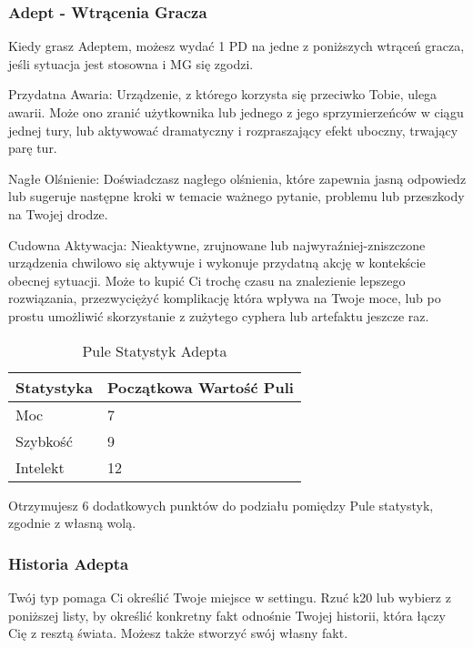 \subsubsection{Adept - Wtrącenia Gracza}

Kiedy grasz Adeptem, możesz wydać 1 PD na jedne z poniższych wtrąceń gracza, jeśli sytuacja jest stosowna i MG się zgodzi.
 
Przydatna Awaria: Urządzenie, z którego korzysta się przeciwko Tobie, ulega awarii. Może ono zranić użytkownika lub jednego z jego sprzymierzeńców w ciągu jednej tury, lub aktywować dramatyczny i rozpraszający efekt uboczny, trwający parę tur.

Nagłe Olśnienie: Doświadczasz nagłego olśnienia, które zapewnia jasną odpowiedz lub sugeruje następne kroki w temacie ważnego pytanie, problemu lub przeszkody na Twojej drodze. 

Cudowna Aktywacja: Nieaktywne, zrujnowane lub najwyraźniej-zniszczone urządzenia chwilowo się aktywuje i wykonuje przydatną akcję w kontekście obecnej sytuacji. Może to kupić Ci trochę czasu na znalezienie lepszego rozwiązania, przezwyciężyć komplikację która wpływa na Twoje moce, lub po prostu umożliwić skorzystanie z zużytego cyphera lub artefaktu jeszcze raz. 

\begin{table*}[t]
 \centering
 \begin{tabularx}{\textwidth}{ | X | X |}
  \hline
  \textbf{ Statystyka} & \textbf{Początkowa Wartość Puli}  \\ \hline
    Moc & 7 \\ \hline
    Szybkość & 9 \\ \hline
    Intelekt & 12 \\ \hline
 \end{tabularx}
  \caption {Pule Statystyk Adepta}
  \label {Pule Statystyk Adepta}
 \end{table*}
 
 Otrzymujesz 6 dodatkowych punktów do podziału pomiędzy Pule statystyk, zgodnie z własną wolą.
 
\subsubsection{Historia Adepta}

Twój typ pomaga Ci określić Twoje miejsce w settingu. Rzuć k20 lub wybierz z poniższej listy, by określić konkretny fakt odnośnie Twojej historii, która łączy Cię z resztą świata. Możesz także stworzyć swój własny fakt. 

